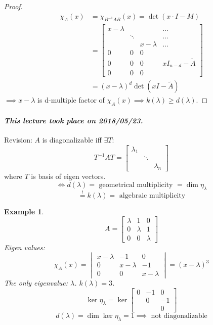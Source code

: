 \documentclass{article}
\newtheorem{example}{Example}  \numberwithin{example}{section}
\newcommand{\dateref}[1]{\paragraph{\textit{This lecture took place on #1.}}}
\begin{document}
\begin{proof}
  \begin{align*}
    \chi_A(x) &= \chi_{B^{-1} AB}(x) = \det(x \cdot I - M) \\
      &= \begin{bmatrix} x-\lambda & & & \dots \\ & \ddots & & \dots \\ & & x-\lambda & \dots \\ 0 & 0 & 0 & \\ 0 & 0 & 0 & xI_{n-d} - \tilde A \\ 0 & 0 & 0 & \end{bmatrix} \\
      &= (x - \lambda)^d \det(xI - \tilde A)
  \end{align*}
  $\implies x - \lambda$ is d-multiple factor of $\chi_A(x) \implies k(\lambda) \geq d(\lambda)$.
\end{proof}

\dateref{2018/05/23}

Revision:
$A$ is diagonalizable iff $\exists T$:
\[ T^{-1} AT = \begin{bmatrix} \lambda_1 & & \\ & \ddots & \\ & & \lambda_n \end{bmatrix} \]
where $T$ is basis of eigen vectors.
\[ \iff d(\lambda) = \text{ geometrical multiplicity } = \dim{\eta_{\lambda}} \]
\[ \overset!= k(\lambda) = \text{ algebraic multiplicity} \]

\begin{example}
  \[ A = \begin{bmatrix} \lambda & 1 & 0 \\ 0 & \lambda & 1 \\ 0 & 0 & \lambda \end{bmatrix} \]
  Eigen values:
  \[ \chi_A(x) = \begin{vmatrix} x - \lambda & -1 & 0 \\ 0 & x - \lambda & -1 \\ 0 & 0 & x - \lambda \end{vmatrix} = (x - \lambda)^3 \]
  The only eigenvalue: $\lambda$.
  $k(\lambda) = 3$.
  \[ \ker{\eta_{\lambda}} = \ker\begin{bmatrix} 0 & -1 & 0 \\ & 0 & -1 \\ & & 0 \end{bmatrix} \]
  \[ d(\lambda) = \dim\ker{\eta_{\lambda}} = 1 \implies \text{ not diagonalizable} \]
\end{example}
\end{document}
